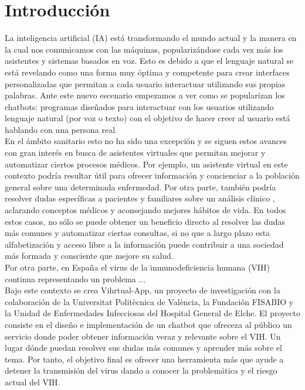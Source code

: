 \section{Introducción}
La inteligencia artificial (IA) está transformando el mundo actual y la manera en la cual nos comunicamos con las máquinas, popularizándose cada vez más los asistentes y sistemas basados en voz. Esto es debido a que el lenguaje natural se está revelando como una forma muy óptima y competente para crear interfaces personalizadas que permitan a cada usuario interactuar utilizando sus propias palabras. Ante este nuevo escenario empezamos a ver como se popularizan los chatbots: programas diseñados para interactuar con los usuarios utilizando lenguaje natural (por voz o texto) con el objetivo de hacer creer al usuario está hablando con una persona real. \\

En el ámbito sanitario esto no ha sido una excepción y se siguen estos avances con gran interés en busca de asistentes virtuales que permitan mejorar y automatizar ciertos procesos médicos\cite{healthAgents}. Por ejemplo, un asistente virtual en este contexto podría resultar útil para ofrecer información y concienciar a la población general sobre una determinada enfermedad. Por otra parte, también podría resolver dudas específicas a pacientes y familiares sobre un análisis clínico \cite{healthAgents}, aclarando conceptos médicos y aconsejando mejores hábitos de vida. En todos estos casos, no sólo se puede obtener un beneficio directo al resolver las dudas más comunes y automatizar ciertas consultas, si no que a largo plazo esta alfabetización y acceso libre a la información puede contribuir a una sociedad más formada y consciente que mejore su salud.\\

Por otra parte, en España el virus de la inmunodeficiencia humana (VIH) continua representando un problema ...\\

Bajo este contexto se crea Vihrtual-App, un proyecto de investigación con la colaboración de la Universitat Politècnica de València, la Fundación FISABIO y la Unidad de Enfermedades Infecciosas del Hospital General de Elche. El proyecto consiste en el diseño e implementación de un chatbot que ofreceza al público un servicio donde poder obtener información veraz y relevante sobre el VIH. Un lugar dónde puedan resolver sus dudas más comunes y aprender más sobre el tema. Por tanto, el objetivo final es ofrecer una herramienta más que ayude a detener la transmisión del virus dando a conocer la problemática y el riesgo actual del VIH.\\ %

